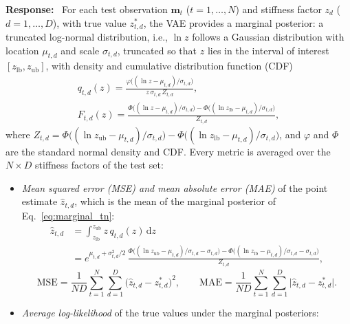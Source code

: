 \documentclass[11pt]{article}
\newenvironment{response}{\par\smallskip\noindent\color{resp}\textbf{Response:}\ }{\par}
\newcommand{\m}{\mathbf{m}}
\begin{document}
\begin{response}
	For each test observation $\m_t$ ($t=1,\dots,N$) and stiffness factor $z_d$ ($d=1,\dots,D$), with true value
	$z^*_{t,d}$, the VAE provides a marginal posterior: a truncated log-normal distribution, i.e., $\ln z$ follows a Gaussian
	distribution with location $\mu_{t,d}$ and scale $\sigma_{t,d}$, truncated so that $z$ lies in the interval of interest
	$[z_{\text{lb}},z_{\text{ub}}]$, with density and cumulative distribution function (CDF)
	\begin{equation}
		\begin{gathered}
		q_{t,d}(z)=\frac{\varphi\big((\ln z-\mu_{t,d})/\sigma_{t,d}\big)}{z\,\sigma_{t,d}\,Z_{t,d}},\\
		F_{t,d}(z)=\frac{\Phi\big((\ln z-\mu_{t,d})/\sigma_{t,d}\big)-\Phi\big((\ln z_{\text{lb}}-\mu_{t,d})/\sigma_{t,d}\big)}{Z_{t,d}},
		\end{gathered}
		\label{eq:marginal_tn}
	\end{equation}
	where $Z_{t,d}=\Phi\big((\ln z_{\text{ub}}-\mu_{t,d})/\sigma_{t,d}\big)-\Phi\big((\ln z_{\text{lb}}-\mu_{t,d})/\sigma_{t,d}\big)$, and $\varphi$ and
	$\Phi$ are the standard normal density and CDF. Every metric is averaged over the $N\times D$ stiffness factors of the
	test set:
	\begin{itemize}[leftmargin=*]
		\item \emph{Mean squared error (MSE) and mean absolute error (MAE)} of the point estimate $\hat z_{t,d}$, which is the
		mean of the marginal posterior of Eq.~\eqref{eq:marginal_tn}:
		\begin{equation*}
			\begin{aligned}
			\hat z_{t,d}&=\int_{z_{\text{lb}}}^{z_{\text{ub}}} z\,q_{t,d}(z)\,\mathrm{d}z\\
			&=e^{\mu_{t,d}+\sigma_{t,d}^2/2}\,\frac{\Phi\big((\ln z_{\text{ub}}-\mu_{t,d})/\sigma_{t,d}-\sigma_{t,d}\big)-\Phi\big((\ln z_{\text{lb}}-\mu_{t,d})/\sigma_{t,d}-\sigma_{t,d}\big)}{Z_{t,d}},
			\end{aligned}
		\end{equation*}
		\begin{equation}
			\mathrm{MSE}=\frac{1}{ND}\sum_{t=1}^{N}\sum_{d=1}^{D}\big(\hat z_{t,d}-z^*_{t,d}\big)^2,\qquad
			\mathrm{MAE}=\frac{1}{ND}\sum_{t=1}^{N}\sum_{d=1}^{D}\big|\hat z_{t,d}-z^*_{t,d}\big|.
			\label{eq:mse_mae}
		\end{equation}
		\item \emph{Average log-likelihood} of the true values under the marginal posteriors:
		\begin{equation}

\end{equation}
\end{itemize}
\end{response}
\end{document}
